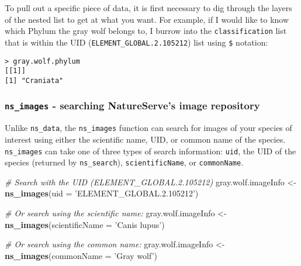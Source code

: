 \documentclass[]{article}
\newenvironment{Shaded}{\begin{snugshade}}{\end{snugshade}}
\newcommand{\CommentTok}[1]{\textcolor[rgb]{0.56,0.35,0.01}{\textit{#1}}}
\newcommand{\DataTypeTok}[1]{\textcolor[rgb]{0.13,0.29,0.53}{#1}}
\newcommand{\FloatTok}[1]{\textcolor[rgb]{0.00,0.00,0.81}{#1}}
\newcommand{\KeywordTok}[1]{\textcolor[rgb]{0.13,0.29,0.53}{\textbf{#1}}}
\newcommand{\NormalTok}[1]{#1}
\newcommand{\OperatorTok}[1]{\textcolor[rgb]{0.81,0.36,0.00}{\textbf{#1}}}
\newcommand{\StringTok}[1]{\textcolor[rgb]{0.31,0.60,0.02}{#1}}
\begin{document}
To pull out a specific piece of data, it is first necessary to dig
through the layers of the nested list to get at what you want. For
example, if I would like to know which Phylum the gray wolf belongs to,
I burrow into the \texttt{classification} list that is within the UID
(\texttt{ELEMENT\_GLOBAL.2.105212}) list using \texttt{\$} notation:

\begin{Shaded}
\end{Shaded}

\begin{verbatim}
> gray.wolf.phylum
[[1]]
[1] "Craniata"
\end{verbatim}

\hypertarget{ns_images---searching-natureserves-image-repository}{%
\subsubsection{\texorpdfstring{\texttt{ns\_images} - searching
NatureServe's image
repository}{ns\_images - searching NatureServe's image repository}}\label{ns_images---searching-natureserves-image-repository}}

Unlike \texttt{ns\_data}, the \texttt{ns\_images} function can search
for images of your species of interest using either the scientific name,
UID, or common name of the species. \texttt{ns\_images} can take one of
three types of search information: \texttt{uid}, the UID of the species
(returned by \texttt{ns\_search}), \texttt{scientificName}, or
\texttt{commonName}.

\begin{Shaded}
\begin{Highlighting}[]
\CommentTok{# Search with the UID (ELEMENT_GLOBAL.2.105212)}
\NormalTok{gray.wolf.imageInfo <-}\StringTok{ }\KeywordTok{ns_images}\NormalTok{(}\DataTypeTok{uid =} \StringTok{'ELEMENT_GLOBAL.2.105212'}\NormalTok{)}

\CommentTok{# Or search using the scientific name:}
\NormalTok{gray.wolf.imageInfo <-}\StringTok{ }\KeywordTok{ns_images}\NormalTok{(}\DataTypeTok{scientificName =} \StringTok{'Canis lupus'}\NormalTok{)}

\CommentTok{# Or search using the common name:}
\NormalTok{gray.wolf.imageInfo <-}\StringTok{ }\KeywordTok{ns_images}\NormalTok{(}\DataTypeTok{commonName =} \StringTok{'Gray wolf'}\NormalTok{)}
\end{Highlighting}
\end{Shaded}
\end{document}
